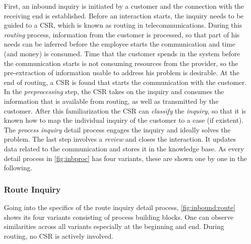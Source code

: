 	 First, an inbound inquiry is initiated by a customer and the connection with the receiving end is established. Before an interaction starts, the inquiry needs to be guided to a \acrshort{CSR}, which is known as routing in telecommunications. During this \textit{routing} process, information from the customer is processed, so that part of his needs can be inferred before the employee starts the communication and time (and money) is consumed. Time that the customer spends in the system before the communication starts is not consuming resources from the provider, so the pre-extraction of information usable to address his problem is desirable. At the end of routing, a \acrshort{CSR} is found that starts the communication with the customer. In the \textit{preprocessing} step, the \acrshort{CSR} takes on the inquiry and consumes the information that is available from routing, as well as transmitted by the customer. After this familiarization the \acrshort{CSR} can \textit{classify} the \textit{inquiry}, so that it is known how to map the individual inquiry of the customer to a case (if existent). The \textit{process inquiry} detail process engages the inquiry and ideally solves the problem. The last step involves a \textit{review} and closes the interaction. It updates data related to the communication and stores it in the knowledge base. As every detail process in \Fig \ref{fig:inbproc} has four variants, these are shown one by one in the following. 
	 
	 \subsubsection{Route Inquiry}
	 
	 Going into the specifics of the route inquiry detail process, \Fig \ref{fig:inbound:route} shows its four variants consisting of process building blocks. One can observe similarities 
	 across all variants especially at the beginning and end. During routing, no \acrshort{CSR} is actively involved.
	 \\
	 
